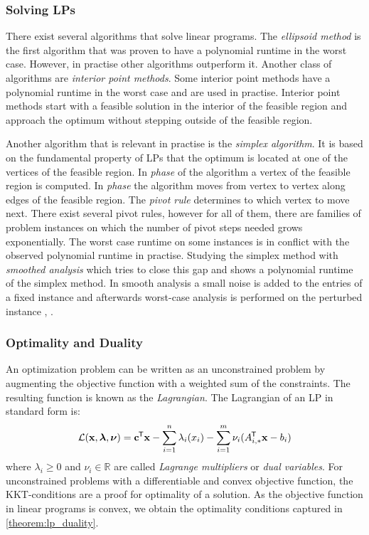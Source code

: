 \subsubsection{Solving LPs}
There exist several algorithms that solve linear programs. The \textit{ellipsoid method} is the first algorithm that was proven to have a polynomial runtime in the worst case. However, in practise other algorithms outperform it. Another class of algorithms are \textit{interior point methods}. Some interior point methods have a polynomial runtime in the worst case and are used in practise. Interior point methods start with a feasible solution in the interior of the feasible region and approach the optimum without stepping outside of the feasible region. \cite{understanding_lp}

Another algorithm that is relevant in practise is the \textit{simplex algorithm}. It is based on the fundamental property of LPs that the optimum is located at one of the vertices of the feasible region. In \textit{phase } of the algorithm a vertex of the feasible region is computed. In \textit{phase } the algorithm moves from vertex to vertex along edges of the feasible region. The \textit{pivot rule} determines to which vertex to move next. There exist several pivot rules, however for all of them, there are families of problem instances on which the number of pivot steps needed grows exponentially. The worst case runtime on some instances is in conflict with the observed polynomial runtime in practise. Studying the simplex method with \textit{smoothed analysis} which tries to close this gap and shows a polynomial runtime of the simplex method. In smooth analysis a small noise is added to the entries of a fixed instance and afterwards worst-case analysis is performed on the perturbed instance \cite{huiberts}, \cite{dadush}.

\subsubsection{Optimality and Duality}
An optimization problem can be written as an unconstrained problem by augmenting the objective function with a weighted sum of the constraints. The resulting function is known as the \textit{Lagrangian}.
The Lagrangian of an LP in standard form is: 
\begin{equation} \label{Eq:lagrangian}
\mathcal{L} (\bold x, \boldsymbol{\lambda}, \boldsymbol \nu) = \bold c ^{\mkern-1.5mu\mathsf{T}} \bold x - \sum_{i=1}^n \lambda_i (x_i) - \sum_{i=1}^m \bold \nu_i (A_{i,*} ^{\mkern-1.5mu\mathsf{T}} \bold x - b_i)
\end{equation} 
where $\lambda_i \geq 0$ and $\nu_i \in \mathbb{R}$ are called \textit{Lagrange multipliers} or \textit{dual variables}.
For unconstrained problems with a differentiable and convex objective function, the KKT-conditions are a proof for optimality of a solution. As the objective function in linear programs is convex, we obtain the optimality conditions captured in \cref{theorem:lp_duality}. \cite{boyd_stephen_convex_2004} 

